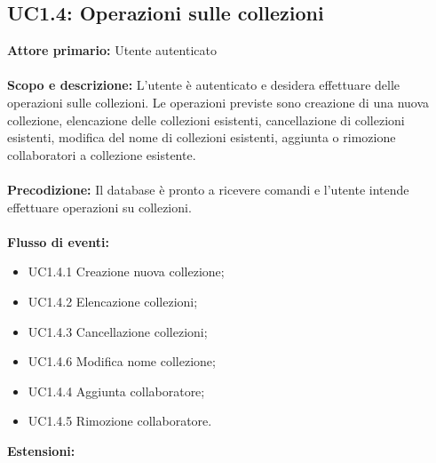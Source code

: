\documentclass{scalatekids-article}
\begin{document}
\subsection{UC1.4: Operazioni sulle collezioni}
\textbf{Attore primario:} Utente autenticato\\ \\
\textbf{Scopo e descrizione:} L'utente è autenticato e desidera effettuare delle operazioni sulle collezioni. Le operazioni previste sono
creazione di una nuova collezione, elencazione delle collezioni esistenti, cancellazione di collezioni esistenti, modifica del nome di collezioni esistenti,
aggiunta o rimozione collaboratori a collezione esistente.\\ \\
\textbf{Precodizione:} Il database è pronto a ricevere comandi e l'utente intende effettuare operazioni su collezioni.\\ \\
\textbf{Flusso di eventi:}
\begin{itemize}
\item UC1.4.1 Creazione nuova collezione;
\item UC1.4.2 Elencazione collezioni;
\item UC1.4.3 Cancellazione collezioni;
\item UC1.4.6 Modifica nome collezione;
\item UC1.4.4 Aggiunta collaboratore;
\item UC1.4.5 Rimozione collaboratore.
\end{itemize}
\textbf{Estensioni:}
\end{document}
